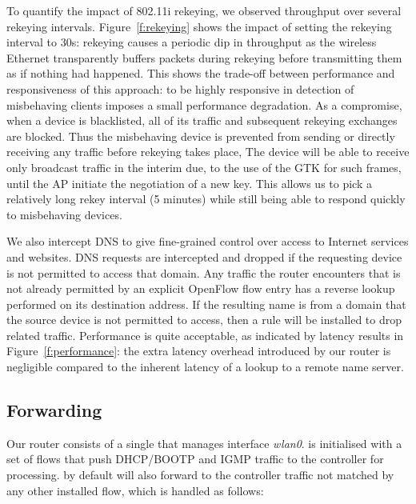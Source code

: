 To quantify the impact of 802.11i rekeying, we observed throughput over several
rekeying intervals.  Figure~\ref{f:rekeying} shows the impact of setting the
rekeying interval to 30s: rekeying causes a periodic dip in throughput as the
wireless Ethernet transparently buffers packets during rekeying before
transmitting them as if nothing had happened.  This shows the trade-off between
performance and responsiveness of this approach: to be highly responsive in
detection of misbehaving clients imposes a small performance degradation.  As a
compromise, when a device is blacklisted, all of its traffic and subsequent
rekeying exchanges are blocked.  Thus the misbehaving device is prevented from
sending or directly receiving any traffic before rekeying takes place, The
device will be able to receive only broadcast traffic in the interim due, to the
use of the GTK for such frames, until the AP initiate the negotiation of a new
key.  This allows us to pick a relatively long rekey interval (5 minutes) while
still being able to respond quickly to misbehaving devices.

We also intercept DNS to give fine-grained control over access to Internet
services and websites.  DNS requests are intercepted and dropped if the
requesting device is not permitted to access that domain.  Any traffic the
router encounters that is not already permitted by an explicit OpenFlow flow
entry has a reverse lookup performed on its destination address.  If the
resulting name is from a domain that the source device is not permitted to
access, then a rule will be installed to drop related traffic.  Performance is
quite acceptable, as indicated by latency results in Figure~\ref{f:performance}:
the extra latency overhead introduced by our router is negligible compared to
the inherent latency of a lookup to a remote name server.  

\subsection{Forwarding} \label{s:forwarding}
 
Our router consists of a single \ovs that manages interface
\emph{wlan0}.  \ovs is initialised with a set of flows that push
DHCP/BOOTP and IGMP traffic to the controller for processing.
\ovs by default will also forward to the controller traffic not matched
by any other installed flow, which is handled as follows:

